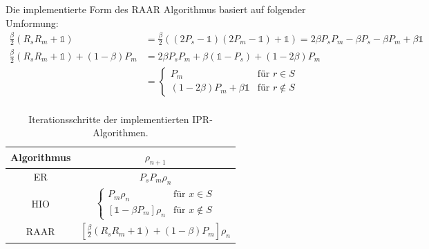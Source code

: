 Die implementierte Form des RAAR Algorithmus basiert auf folgender Umformung:
\begin{align*}
	\frac{\beta}{2}\left(R_sR_m+\mathbb{1}\right)
	                              & =\frac{\beta}{2}\left((2P_s-\mathbb{1})(2P_m-\mathbb{1})+\mathbb{1}\right) 
	=2\beta P_sP_m-\beta P_s-\beta P_m+\beta\mathbb{1}\\
	\frac{\beta}{2}\left(R_sR_m+\mathbb{1}\right)+\left(1-\beta\right) P_m
	                              & =2\beta P_sP_m+\beta (\mathbb{1}-P_s)+ (1-2\beta)P_m                       \\
	                              & =                                                                          
	\begin{cases}
	P_m                           & \text{für } r\in S                                                        \\
	(1-2\beta)P_m+\beta\mathbb{1} & \text{für } r\notin S                                                     
	\end{cases}\\
\end{align*}
\begin{table}
	\centering
	\begin{tabular}{cc}
		\hline
		Algorithmus                             & $\rho_{n+1}$                                                                               \\ 							
		\hline
		ER                                      & $P_sP_m\rho_n$                                                                             \\ 								
		HIO                                     & $\begin{cases}                                                                             
		P_m\rho_n                               & \text{für } x\in S                                                                        \\
		\left[\mathbb{1}-\beta P_m\right]\rho_n & \text{für } x\notin S                                                                     
		\end{cases}$\\
		RAAR                                    & $\left[\frac{\beta}{2}\left(R_sR_m+\mathbb{1}\right)+\left(1-\beta\right)P_m\right]\rho_n$ \\																
		\hline
	\end{tabular}
	\caption[IPR-Algorithmen]{Iterationsschritte der implementierten IPR-Algorithmen.}
	\label{tab:ipr}
\end{table}	

